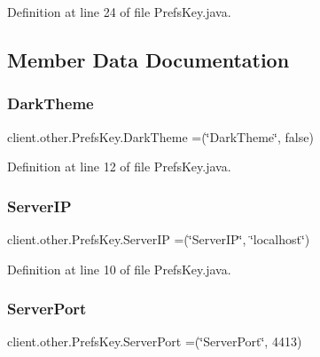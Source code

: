 Definition at line 24 of file Prefs\+Key.\+java.



\subsection{Member Data Documentation}
\hypertarget{enumclient_1_1other_1_1_prefs_key_a1712884dcd2b70030aa4e9baadfc5d65}{}\label{enumclient_1_1other_1_1_prefs_key_a1712884dcd2b70030aa4e9baadfc5d65} 
\subsubsection{\texorpdfstring{Dark\+Theme}{DarkTheme}}
{\footnotesize\ttfamily client.\+other.\+Prefs\+Key.\+Dark\+Theme =(\char`\"{}Dark\+Theme\char`\"{}, false)}



Definition at line 12 of file Prefs\+Key.\+java.

\hypertarget{enumclient_1_1other_1_1_prefs_key_afb3297cc8cba1e49ec031c14e115feb8}{}\label{enumclient_1_1other_1_1_prefs_key_afb3297cc8cba1e49ec031c14e115feb8} 
\subsubsection{\texorpdfstring{Server\+IP}{ServerIP}}
{\footnotesize\ttfamily client.\+other.\+Prefs\+Key.\+Server\+IP =(\char`\"{}Server\+IP\char`\"{}, \char`\"{}localhost\char`\"{})}



Definition at line 10 of file Prefs\+Key.\+java.

\hypertarget{enumclient_1_1other_1_1_prefs_key_a967610c3389ceac5034551d3f69c564c}{}\label{enumclient_1_1other_1_1_prefs_key_a967610c3389ceac5034551d3f69c564c} 
\subsubsection{\texorpdfstring{Server\+Port}{ServerPort}}
{\footnotesize\ttfamily client.\+other.\+Prefs\+Key.\+Server\+Port =(\char`\"{}Server\+Port\char`\"{}, 4413)}



